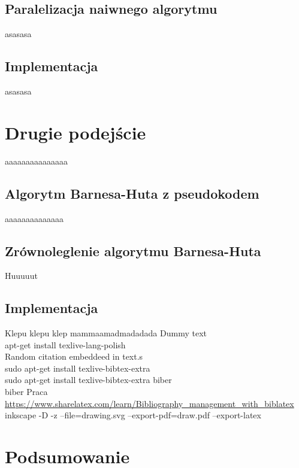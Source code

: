 \documentclass[13pt,twoside,a4paper]{article}
\begin{document}
\subsection{\Large Paralelizacja naiwnego algorytmu}

asasasa

\subsection{\Large Implementacja}

asasasa

\section{\LARGE Drugie podejście}

aaaaaaaaaaaaaaa

\subsection{\Large Algorytm Barnesa-Huta z pseudokodem}

aaaaaaaaaaaaaa

\subsection{\Large Zrównoleglenie algorytmu Barnesa-Huta}

Huuuuut

\subsection{\Large Implementacja}

Klepu klepu klep
mammaamadmadadada
Dummy text\\
apt-get install texlive-lang-polish\\
Random citation embeddeed in text.s\\
 sudo apt-get install texlive-bibtex-extra\\
 sudo apt-get install texlive-bibtex-extra biber\\
biber Praca\\
\url{https://www.sharelatex.com/learn/Bibliography_management_with_biblatex}\\
inkscape -D -z --file=drawing.svg --export-pdf=draw.pdf --export-latex


\section{\LARGE Podsumowanie}

\newpage

\nocite{*}
\printbibliography
\end{document}
